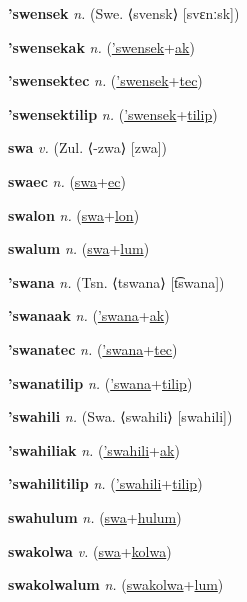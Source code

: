 \textbf{\hypertarget{'swensek}{'swensek}} \textit{n.} (Swe. ⟨svensk⟩ [svɛnːsk])


\textbf{\hypertarget{'swensekak}{'swensekak}} \textit{n.} (\hyperlink{'swensek}{'swensek}+\allowbreak \hyperlink{ak}{ak})


\textbf{\hypertarget{'swensektec}{'swensektec}} \textit{n.} (\hyperlink{'swensek}{'swensek}+\allowbreak \hyperlink{tec}{tec})


\textbf{\hypertarget{'swensektilip}{'swensektilip}} \textit{n.} (\hyperlink{'swensek}{'swensek}+\allowbreak \hyperlink{tilip}{tilip})


\textbf{\hypertarget{swa}{swa}} \textit{v.} (Zul. ⟨-zwa⟩ [zwa])


\textbf{\hypertarget{swaec}{swaec}} \textit{n.} (\hyperlink{swa}{swa}+\allowbreak \hyperlink{ec}{ec})


\textbf{\hypertarget{swalon}{swalon}} \textit{n.} (\hyperlink{swa}{swa}+\allowbreak \hyperlink{lon}{lon})


\textbf{\hypertarget{swalum}{swalum}} \textit{n.} (\hyperlink{swa}{swa}+\allowbreak \hyperlink{lum}{lum})


\textbf{\hypertarget{'swana}{'swana}} \textit{n.} (Tsn. ⟨tswana⟩ [t͡swana])


\textbf{\hypertarget{'swanaak}{'swanaak}} \textit{n.} (\hyperlink{'swana}{'swana}+\allowbreak \hyperlink{ak}{ak})


\textbf{\hypertarget{'swanatec}{'swanatec}} \textit{n.} (\hyperlink{'swana}{'swana}+\allowbreak \hyperlink{tec}{tec})


\textbf{\hypertarget{'swanatilip}{'swanatilip}} \textit{n.} (\hyperlink{'swana}{'swana}+\allowbreak \hyperlink{tilip}{tilip})


\textbf{\hypertarget{'swahili}{'swahili}} \textit{n.} (Swa. ⟨swahili⟩ [swahili])


\textbf{\hypertarget{'swahiliak}{'swahiliak}} \textit{n.} (\hyperlink{'swahili}{'swahili}+\allowbreak \hyperlink{ak}{ak})


\textbf{\hypertarget{'swahilitilip}{'swahilitilip}} \textit{n.} (\hyperlink{'swahili}{'swahili}+\allowbreak \hyperlink{tilip}{tilip})


\textbf{\hypertarget{swahulum}{swahulum}} \textit{n.} (\hyperlink{swa}{swa}+\allowbreak \hyperlink{hulum}{hulum})


\textbf{\hypertarget{swakolwa}{swakolwa}} \textit{v.} (\hyperlink{swa}{swa}+\allowbreak \hyperlink{kolwa}{kolwa})


\textbf{\hypertarget{swakolwalum}{swakolwalum}} \textit{n.} (\hyperlink{swakolwa}{swakolwa}+\allowbreak \hyperlink{lum}{lum})


